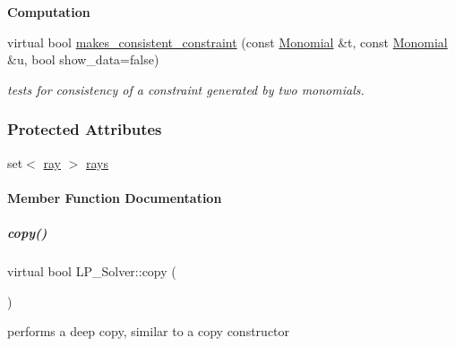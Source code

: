 \begin{Indent}\textbf{ Computation}\par
\begin{DoxyCompactItemize}
\item 
\mbox{\label{group___c_l_s_solvers_a2e909dd41a7f116c62868e3e6c278a2e}} 
virtual bool \hyperlink{group___c_l_s_solvers_a2e909dd41a7f116c62868e3e6c278a2e}{makes\+\_\+consistent\+\_\+constraint} (const \hyperlink{group__polygroup_class_monomial}{Monomial} \&t, const \hyperlink{group__polygroup_class_monomial}{Monomial} \&u, bool show\+\_\+data=false)
\begin{DoxyCompactList}\small\item\em tests for consistency of a constraint generated by two monomials. \end{DoxyCompactList}\end{DoxyCompactItemize}
\end{Indent}
\subsubsection*{Protected Attributes}
\begin{DoxyCompactItemize}
\item 
set$<$ \hyperlink{group___c_l_s_solvers_classray}{ray} $>$ \hyperlink{group___c_l_s_solvers_aa89c9167eb3ef921b57d74057217f407}{rays}
\end{DoxyCompactItemize}


\paragraph{Member Function Documentation}
\mbox{\label{group___c_l_s_solvers_a442ad4ad67ee2feff0df49e9201d61ca}} 
\subparagraph{\texorpdfstring{copy()}{copy()}}
{\footnotesize\ttfamily virtual bool L\+P\+\_\+\+Solver\+::copy (\begin{DoxyParamCaption}\item[{const \hyperlink{group___c_l_s_solvers_class_l_p___solver}{L\+P\+\_\+\+Solver} $\ast$}]{ }\end{DoxyParamCaption})\hspace{0.3cm}{\ttfamily [pure virtual]}}



performs a deep copy, similar to a copy constructor 

